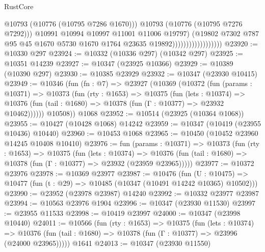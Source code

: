 \begin{lexlean}{RustCore}
\begin{coremodule}
                                            @10793
                                            (@10776 (@10795 @7286 @1670)))
                                          @10793
                                          (@10776 (@10795 @7276 @7292)))
                                        @10991
                                        @10994
                                        @10997
                                        @11001
                                        @11006
                                        @19797)
                                      (@19802
                                        @7302
                                        @787
                                        @95
                                        @45
                                        @1670
                                        @5730
                                        @1670
                                        @1764
                                        @23635
                                        @19892))))))))))))))))))
@23920 := @10330 @297
@23924 := @10332 (@10336 @297) (@10342 @297)
@23925 := @10351 @14239
@23927 := @10347 (@23925 @10366)
@23929 := @10389 (@10390 @297)
@23930 := @10385 @23929
@23932 := @10347 (@23930 @10415)
@23949 := @10346
    (fun (fn : @7) =>
    @23927
      (@10369
        (@10372
          (fun (params : @10371) =>
          @10373
            (fun (rty : @1653) =>
            @10375
              (fun (lets : @10374) =>
              @10376 (fun (tail : @1680) => @10378 (fun (Γ : @10377) => @23932 @10462))))))
        @10508))
    @1068
@23952 := @10514 (@23925 (@10364 @1068))
@23955 := @10427 (@10428 @1068) @14242
@23959 := @10347 (@10419 (@23955 @10436) @10440)
@23960 := @10453 @1068
@23965 := @10450 (@10452 @23960 @14245 @10408 @10410)
@23976 := fun (params : @10371) =>
  @10373
    (fun (rty : @1653) =>
    @10375
      (fun (lets : @10374) =>
      @10376 (fun (tail : @1680) => @10378 (fun (Γ : @10377) => @23932 (@23959 @23965)))))
@23977 := @10372 @23976
@23978 := @10369 @23977
@23987 := @10476
    (fun (U : @10475) => @10477 (fun (t : @29) => @10485 (@10347 (@10491 @14242 @10365) @10502)))
@23990 := @23952 (@23978 @23987) @14240
@23992 := @10332 @23977 @23987
@23994 := @10563 @23976 @1904
@23996 := @10347 (@23930 @11530)
@23997 := @23955 @11533
@23998 := @10419 @23997
@24000 := @10347 (@23998 @10440)
@24011 := @10566
    (fun (rty : @1653) =>
    @10375
      (fun (lets : @10374) =>
      @10376 (fun (tail : @1680) => @10378 (fun (Γ : @10377) => @23996 (@24000 @23965)))))
    @1641
@24013 := @10347 (@23930 @11550)

\end{coremodule}
\end{lexlean}
